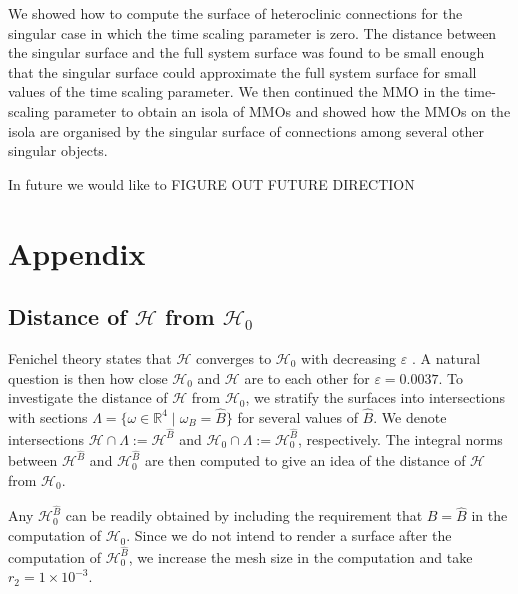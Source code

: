 \documentclass{ws-ijbc}
\begin{document}
We showed how to compute the surface of heteroclinic connections for the singular case in which the time scaling parameter is zero.  The distance between the singular surface and the full system surface was found to be small enough that the singular surface could approximate the full system surface for small values of the time scaling parameter.  We then continued the MMO in the time-scaling parameter to obtain an isola of MMOs and showed how the MMOs on the isola are organised by the singular surface of connections among several other singular objects.

In future we would like to FIGURE OUT FUTURE DIRECTION

\section{Appendix}

\subsection{Distance of $\mathscr{H}$ from $\mathscr{H}_0$}

Fenichel theory states that $\mathscr{H}$ converges to $\mathscr{H}_0$ with decreasing $\varepsilon$ \cite{Fenichel}.  A natural question is then how close $\mathscr{H}_0$ and $\mathscr{H}$ are to each other for $\varepsilon=0.0037$.  To investigate the distance of $\mathscr{H}$ from $\mathscr{H}_0$, we stratify the surfaces into intersections with sections $\Lambda = \{ \omega \in \mathbb{R}^4 \; | \; \omega_B = \widehat{B}\}$ for several values of $\widehat{B}$.  We denote intersections $\mathscr{H} \cap \Lambda := \mathscr{H}^{\widehat{B}}$ and $\mathscr{H}_0 \cap \Lambda := \mathscr{H}_0^{\widehat{B}}$, respectively.  The integral norms between $\mathscr{H}^{\widehat{B}}$ and $\mathscr{H}_0^{\widehat{B}}$ are then computed to give an idea of the distance of $\mathscr{H}$ from $\mathscr{H}_0$.

Any $\mathscr{H}_0^{\widehat{B}}$ can be readily obtained by including the requirement that $B=\widehat{B}$ in the computation of $\mathscr{H}_0$.  Since we do not intend to render a surface after the computation of $\mathscr{H}_0^{\widehat{B}}$, we increase the mesh size in the computation and take $r_2=1\times10^{-3}$.
\end{document}
